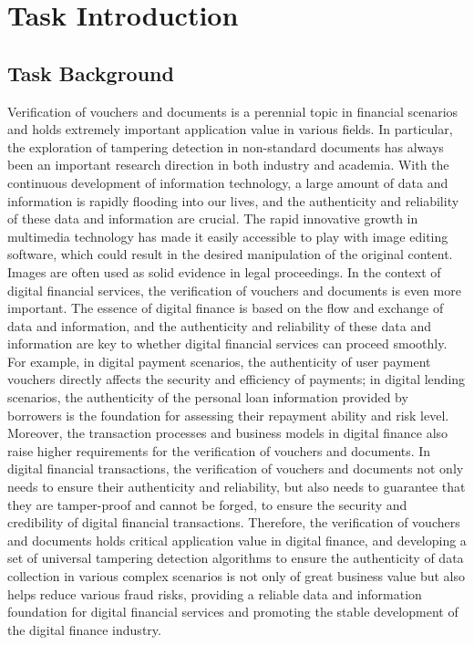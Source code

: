 \section{Task Introduction}
\label{sec:intro}
\subsection{Task Background}

Verification of vouchers and documents is a perennial topic in financial scenarios and holds extremely important application value in various fields. In particular, the exploration of tampering detection in non-standard documents has always been an important research direction in both industry and academia. With the continuous development of information technology, a large amount of data and information is rapidly flooding into our lives, and the authenticity and reliability of these data and information are crucial. The rapid innovative growth in multimedia technology has made it easily accessible to play with image editing software, which could result in the desired manipulation of the original content. Images are often used as solid evidence in legal proceedings.\cite{SANDHYA2024301663, LiuHaoyue2021RGBN} In the context of digital financial services, the verification of vouchers and documents is even more important. The essence of digital finance is based on the flow and exchange of data and information, and the authenticity and reliability of these data and information are key to whether digital financial services can proceed smoothly. For example, in digital payment scenarios, the authenticity of user payment vouchers directly affects the security and efficiency of payments; in digital lending scenarios, the authenticity of the personal loan information provided by borrowers is the foundation for assessing their repayment ability and risk level. Moreover, the transaction processes and business models in digital finance also raise higher requirements for the verification of vouchers and documents. In digital financial transactions, the verification of vouchers and documents not only needs to ensure their authenticity and reliability, but also needs to guarantee that they are tamper-proof and cannot be forged, to ensure the security and credibility of digital financial transactions. Therefore, the verification of vouchers and documents holds critical application value in digital finance, and developing a set of universal tampering detection algorithms to ensure the authenticity of data collection in various complex scenarios is not only of great business value but also helps reduce various fraud risks, providing a reliable data and information foundation for digital financial services and promoting the stable development of the digital finance industry.

